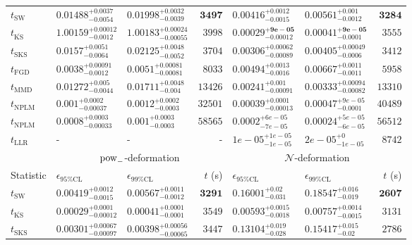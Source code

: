 \begin{tabular}{l|llr|llr}
	\midrule
	$t_{\mathrm{SW}}$ & $0.01488_{-0.0054}^{+0.0037}$ & $0.01998_{-0.0039}^{+0.0032}$ & ${\mathbf{3497}}$ & $0.00416_{-0.0015}^{+0.0012}$ & $0.00561_{-0.0012}^{+0.001}$ & ${\mathbf{3284}}$ \\
	$t_{\overline{\mathrm{KS}}}$ & $1.00159_{-0.0012}^{+0.00012}$ & $1.00183_{-0.00055}^{+0.00024}$ & $3998$ & ${\mathbf{0.00029_{-0.00012}^{+9e-05}}}$ & ${\mathbf{0.00041_{-0.0001}^{+9e-05}}}$ & $3555$ \\
	$t_{\mathrm{SKS}}$ & $0.0157_{-0.0064}^{+0.0051}$ & $0.02125_{-0.0052}^{+0.0048}$ & $3704$ & $0.00306_{-0.00089}^{+0.00062}$ & $0.00405_{-0.0006}^{+0.00049}$ & $3412$ \\
	$t_{\mathrm{FGD}}$ & ${\mathbf{0.0038_{-0.0012}^{+0.00091}}}$ & ${\mathbf{0.0051_{-0.00081}^{+0.00081}}}$ & $8033$ & $0.00494_{-0.0016}^{+0.0013}$ & $0.00667_{-0.0011}^{+0.0011}$ & $5958$ \\
	$t_{\mathrm{MMD}}$ & $0.01272_{-0.0044}^{+0.005}$ & $0.01711_{-0.004}^{+0.0048}$ & $13426$ & $0.00241_{-0.00091}^{+0.001}$ & $0.00333_{-0.00082}^{+0.00094}$ & $13310$ \\
\rowcolor{red!35}	$t_{\mathrm{NPLM}}$ & $0.001_{-0.00037}^{+0.0002}$ & $0.0012_{-0.0003}^{+0.0002}$ & $32501$ & $0.00039_{-0.00013}^{+0.0001}$ & $0.00047_{-0.0001}^{+9e-05}$ & $40489$ \\
\rowcolor{blue!35}	$t_{\mathrm{NPLM}}$ & $0.0008_{-0.00033}^{+0.0003}$ & $0.001_{-0.0003}^{+0.0003}$ & $58565$ & $0.0002_{-7e-05}^{+6e-05}$ & $0.00024_{-6e-05}^{+5e-05}$ & $56512$ \\
	$t_{\mathrm{LLR}}$ & - & - & - & $1e-05_{-1e-05}^{+1e-05}$ & $2e-05_{-1e-05}^{+0}$ & $8742$ \\
	\toprule
	\multicolumn{1}{c}{} & \multicolumn{3}{c}{$\rm{pow}_{-}$-deformation} & \multicolumn{3}{c}{$\mathcal{N}$-deformation} \\
	Statistic & $\epsilon_{95\%\mathrm{CL}}$ & $\epsilon_{99\%\mathrm{CL}}$ & $t$ (s) & $\epsilon_{95\%\mathrm{CL}}$ & $\epsilon_{99\%\mathrm{CL}}$ & $t$ (s) \\
	\midrule
	$t_{\mathrm{SW}}$ & $0.00419_{-0.0015}^{+0.0012}$ & $0.00567_{-0.0012}^{+0.0011}$ & ${\mathbf{3291}}$ & $0.16001_{-0.031}^{+0.02}$ & $0.18547_{-0.019}^{+0.016}$ & ${\mathbf{2607}}$ \\
	$t_{\overline{\mathrm{KS}}}$ & ${\mathbf{0.00029_{-0.00012}^{+0.0001}}}$ & ${\mathbf{0.00041_{-0.0001}^{+0.0001}}}$ & $3549$ & ${\mathbf{0.00593_{-0.0018}^{+0.0015}}}$ & ${\mathbf{0.00757_{-0.0015}^{+0.0014}}}$ & $3131$ \\
	$t_{\mathrm{SKS}}$ & $0.00301_{-0.00097}^{+0.00067}$ & $0.00398_{-0.00065}^{+0.00056}$ & $3447$ & $0.13104_{-0.028}^{+0.019}$ & $0.15417_{-0.02}^{+0.015}$ & $2786$ \\

\end{tabular}
